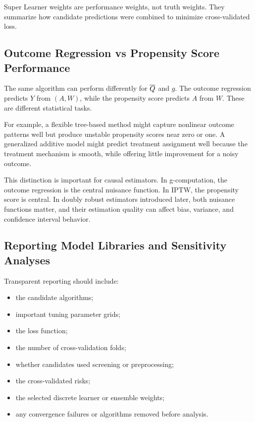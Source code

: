 \begin{keyidea}
Super Learner weights are performance weights, not truth weights. They summarize
how candidate predictions were combined to minimize cross-validated loss.
\end{keyidea}

\subsection{Outcome Regression vs Propensity Score Performance}

The same algorithm can perform differently for $\overline{Q}$ and $g$. The outcome
regression predicts $Y$ from $(A,W)$, while the propensity score predicts $A$ from
$W$. These are different statistical tasks.

For example, a flexible tree-based method might capture nonlinear outcome patterns
well but produce unstable propensity scores near zero or one. A generalized additive
model might predict treatment assignment well because the treatment mechanism is
smooth, while offering little improvement for a noisy outcome.

This distinction is important for causal estimators. In g-computation, the outcome
regression is the central nuisance function. In IPTW, the propensity score is central.
In doubly robust estimators introduced later, both nuisance functions matter, and their
estimation quality can affect bias, variance, and confidence interval behavior.

\subsection{Reporting Model Libraries and Sensitivity Analyses}

Transparent reporting should include:
\begin{itemize}
\item the candidate algorithms;
\item important tuning parameter grids;
\item the loss function;
\item the number of cross-validation folds;
\item whether candidates used screening or preprocessing;
\item the cross-validated risks;
\item the selected discrete learner or ensemble weights;
\item any convergence failures or algorithms removed before analysis.
\end{itemize}

